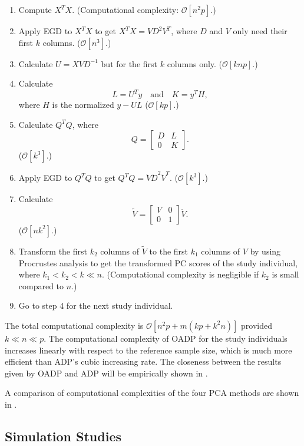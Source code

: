 \documentclass{article}
\newcommand{\bO}{\mathcal{O}}
\begin{document}
\begin{enumerate}
\item Compute $X^T X$.
  (Computational complexity: $\bO[n^2p]$.)  
\item Apply EGD to $X^T X$ to get $X^T X = V D^2 V^T$,
  where $D$ and $V$ only need their first $k$ columns.
  ($\bO[n^3]$.)
\item Calculate $U = X V D^{-1}$ but for the first $k$ columns only.
  ($\bO[k n p]$.)
\item Calculate 
  \[
    L = U^T y \quad \text{and} \quad K = y^T H,
  \]
  where $H$ is the normalized  $y - UL$
  ($\bO[k p]$.)
\item Calculate $Q^T Q$, where
  \[
    Q = 
    \begin{bmatrix}
      D & L \\
      0 & K
    \end{bmatrix}.
  \]
  ($\bO[k^3]$.)
\item Apply EGD to $Q^T Q$ to get $Q^T Q = \ddot{V} \ddot{D}^2 \ddot{V}^T$.
  ($\bO[k^3]$.)
\item Calculate
  \[
    \tilde{V} =
    \begin{bmatrix}
      V & 0 \\
      0 & 1
    \end{bmatrix}
    \ddot{V}.
  \]
  ($\bO[nk^2]$.)
\item Transform the first $k_2$ columns of $\tilde{V}$ to the first $k_1$ columns of $V$ by using Procrustes analysis to get the transformed PC scores of the study individual,
  where $k_1 < k_2  < k \ll n$.
  (Computational complexity is negligible if $k_2$ is small compared to $n$.)
  \item Go to step 4 for the next study individual.
\end{enumerate}

The total computational complexity is $\bO[n^2p + m(kp + k^2n)]$
provided $k \ll n \ll p$.
The computational complexity of OADP for the study individuals increases linearly with respect to the reference sample size,
which is much more efficient than ADP's cubic increasing rate.
The closeness between the results given by OADP and ADP
will be empirically shown in .

A comparison of computational complexities of the four PCA methods are shown in .

\subsection{Simulation Studies}
\end{document}
